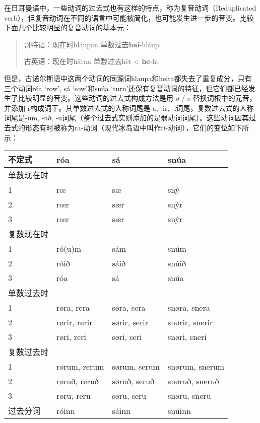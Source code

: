 在日耳曼语中，一些动词的过去式也有这样的特点，称为复音动词（Reduplicated verb），但复音动词在不同的语言中可能被简化，也可能发生进一步的音变。比较下面几个比较明显的复音动词的基本元：

\begin{quote}
    哥特语：现在时hláupan 单数过去\textbf{haí}-hláup

    古英语：现在时hātan 单数过去hēt < \textbf{he}-ht
\end{quote}

但是，古诺尔斯语中这两个动词的同源词hlaupa和heita都失去了重复成分，只有三个动词róa `row‌', sá `sow‌'和snúa `turn‌'还保有复音动词的特征，但它们都已经发生了比较明显的音变。这些动词的过去式构成方法是用-ø-/-e-替换词根中的元音，并添加-r构成词干。其单数过去式的人称词尾是-a, -ir, -i词尾，复数过去式的人称词尾是-um, -uð, -u词尾（整个过去式实则添加的是弱动词词尾）。这些动词因其过去式的形态有时被称为ra-动词（现代冰岛语中叫作ri-动词），它们的变位如下所示：

\begin{longtable}{llll}
    \toprule
    不定式     & róa          & sá           & snúa           \\
    \midrule
    \endhead
    \bottomrule
    \endfoot
    单数现在时 &              &              &                \\
    1          & rœ           & sæ           & sný            \\
    2          & rœr          & sær          & snýr           \\
    3          & rœr          & sær          & snýr           \\
    复数现在时 &              &              &                \\
    1          & ró(u)m       & sám          & snúm           \\
    2          & róið         & sáið         & snúið          \\
    3          & róa          & sá           & snúa           \\
    单数过去时 &              &              &                \\
    1          & røra, rera   & søra, sera   & snøra, snera   \\
    2          & rørir, rerir & sørir, serir & snørir, snerir \\
    3          & røri, reri   & søri, seri   & snøri, sneri   \\
    复数过去时 &              &              &                \\
    1          & rørum, rerum & sørum, serum & snørum, snerum \\
    2          & røruð, reruð & søruð, seruð & snøruð, sneruð \\
    3          & røru, reru   & søru, seru   & snøru, sneru   \\
    过去分词   & róinn        & sáinn        & snúinn         \\
\end{longtable}


